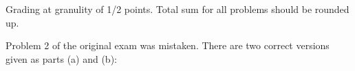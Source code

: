 \documentclass[quiz]{mcs}
\begin{document}
\renewcommand{\exampreamble}{   %
  \begin{tabular}{l}
    \textbf{Circle your}\quad   \teaminfo
  \end{tabular}

  \begin{itemize}

  \item
   This exam is \textbf{closed book} except for a 1-sided cribsheet.
   Total time is 20 minutes. 

  \item
   Write your solutions in the space provided.  If you need more
   space, write on the back of the sheet containing the problem.

\iffalse
  \item
   GOOD LUCK!
\fi

  \end{itemize}}




\begin{staffnotes}
Grading at granulity of 1/2 points.  Total sum for all problems
should be rounded up.
\end{staffnotes}


Problem 2 of the original exam was mistaken.  There are two correct
versions given as parts (a) and (b):
\end{document}
